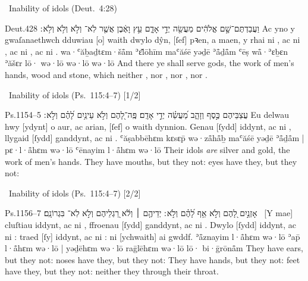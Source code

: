 \begin{frame}{\ex\ Inability of idols \hfill (Deut.~4:28)}
	\begin{example}{Deut.}{4}{28}{}{}
		\quoling
		{וַעֲבַדְתֶּם־שָׁ֣ם אֱלֹהִ֔ים מַעֲשֵׂ֖ה יְדֵ֣י אָדָ֑ם עֵ֣ץ וָאֶ֔בֶן אֲשֶׁ֤ר לֹֽא־ וְלֹ֣א  וְלֹ֥א  וְלֹ֥א ׃}
		{Ac yno y gwaſanaethwch dduwiau [o] waith dwylo dŷn, [ſef] pꝛen, a maen, y rhai ni , ac ni , ac ni , ac ni .}
		{wa·ʿăḇaḏtɛm·šå̄m ʾɛ̆lōhīm maʿăśē yəḏē ʾå̄ḏå̄m ʿēṣ wå̄·ʾɛḇɛn ʾăšɛr lō· wə·lō  wə·lō  wə·lō }
		{And there ye shall serve gods, the work of men’s hands, wood and stone, which neither , nor , nor , nor .}
	\end{example}
\end{frame}



\begin{frame}{\ex\ Inability of idols \hfill (Ps.~115:4–7) [1/2]}
	\begin{example}{Ps.}{115}{4–5}{}{}
		\quoling
		{%
			עֲצַבֵּיהֶם כֶּ֣סֶף וְזָהָ֑ב מַ֝עֲשֵׂ֗ה יְדֵ֣י אָדָֽם׃
			פֶּֽה־לָ֭הֶם וְלֹ֣א  עֵינַ֥יִם לָ֝הֶ֗ם וְלֹ֣א ׃
		}
		{%
			Eu delwau hwy [ydynt] o aur, ac arian, [ſef] o waith dynnion.
			Genau [ſydd] iddynt, ac ni , llygaid [ſydd] ganddynt, ac ni .
		}
		{%
			ʿăṣabbēhɛm kɛsɛp̄ wə·zå̄hå̄ḇ maʿăśē yəḏē ʾå̄ḏå̄m |
			pɛ·l·å̄hɛm wə·lō  ʿēnayim l·å̄hɛm wə·lō 
		}
		{%
			Their idols \textit{are} silver and gold, the work of men’s hands.
			They have mouths, but they  not: eyes have they, but they  not:
		}
	\end{example}
\end{frame}



\begin{frame}{\excont\ Inability of idols \hfill (Ps.~115:4–7) [2/2]}
	\begin{example}{Ps.}{115}{6–7}{}{}
		\quoling
		{%
			אָזְנַ֣יִם לָ֭הֶם וְלֹ֣א  אַ֥ף לָ֝הֶ֗ם וְלֹ֣א ׃
			יְדֵיהֶ֤ם ׀ וְלֹ֬א  רַ֭גְלֵיהֶם וְלֹ֣א  לֹֽא־ בִּגְרוֹנָֽם׃
		}
		{%
			~[Y mae] cluſtiau iddynt, ac ni , ffroenau [ſydd] ganddynt, ac ni .
			Dwylo [ſydd] iddynt, ac ni : traed [ſy] iddynt, ac ni : ni  [ychwaith] ai gwddf.
		}
		{%
			ʾå̄znayim l·å̄hɛm wə·lō  ʾap̄ l·å̄hɛm wə·lō  |
			yəḏēhɛm wə·lō  raḡlēhɛm wə·lō  lō· bi·ḡrōnå̄m
		}
		{%
			They have ears, but they  not: noses have they, but they  not:
			They have hands, but they  not: feet have they, but they  not: neither  they through their throat.
		}
	\end{example}
\end{frame}



